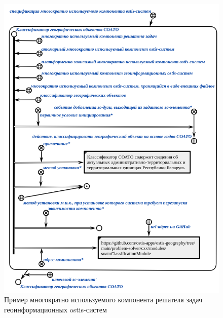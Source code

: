 \begin{figure}[H]
	\includegraphics[scale=0.8]{author/part7/figures/gis_ps_component.png}
	\caption{Пример многократно используемого компонента решателя задач геоинформационных ostis-систем}
	\label{fig:gis_ps_component}
\end{figure}

%